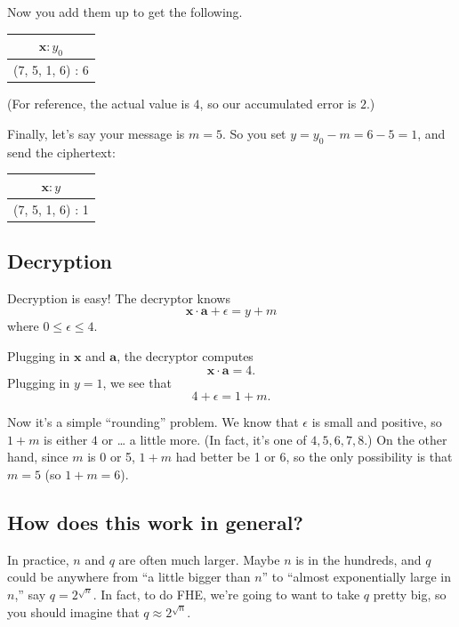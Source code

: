 Now you add them up to get the following.

\begin{center}
\begin{tabular}{|c|}
\hline
$\mathbf{x}:y_{0}$ \\
\hline \hline
(7, 5, 1, 6) : 6 \\
\hline
\end{tabular}
\end{center}

(For reference, the actual value is $4$, so our accumulated error is
$2$.)

Finally, let's say your message is $m = 5$. So you set
$y = y_{0} - m = 6 - 5 = 1$, and send the ciphertext:

\begin{center}
\begin{tabular}{|c|}
\hline
$\mathbf{x}:y$ \\
\hline \hline
(7, 5, 1, 6) : 1 \\
\hline
\end{tabular}
\end{center}

\subsection{Decryption}\label{decryption}

Decryption is easy! The decryptor knows
\[\mathbf{x} \cdot \mathbf{a} + \epsilon = y + m\] where
$0 \leq \epsilon \leq 4$.

Plugging in $\mathbf{x}$ and $\mathbf{a}$, the decryptor computes
\[\mathbf{x} \cdot \mathbf{a} = 4.\] Plugging in $y = 1$, we see that
\[4 + \epsilon = 1 + m.\]

Now it's a simple ``rounding'' problem. We know that $\epsilon$ is
small and positive, so $1 + m$ is either $4$ or \ldots{} a little
more. (In fact, it's one of $4,5,6,7,8$.) On the other hand, since
$m$ is 0 or 5, $1 + m$ had better be 1 or 6, so the only possibility
is that $m = 5$ (so $1 + m = 6$).

\subsection{How does this work in
general?}\label{how-does-this-work-in-general}

In practice, $n$ and $q$ are often much larger. Maybe $n$ is in
the hundreds, and $q$ could be anywhere from ``a little bigger than
$n$'' to ``almost exponentially large in $n$,'' say
$q = 2^{\sqrt{n}}$. In fact, to do FHE, we're going to want to take
$q$ pretty big, so you should imagine that $q \approx 2^{\sqrt{n}}$.

